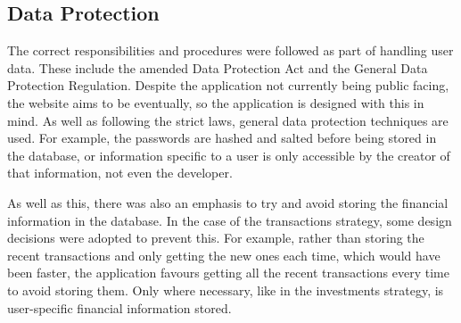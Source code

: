 \subsection{Data Protection}
The correct responsibilities and procedures were followed as part of handling user data. These include the amended Data Protection Act and the General Data Protection Regulation. Despite the application not currently being public facing, the website aims to be eventually, so the application is designed with this in mind. As well as following the strict laws, general data protection techniques are used. For example, the passwords are hashed and salted before being stored in the database, or information specific to a user is only accessible by the creator of that information, not even the developer.

As well as this, there was also an emphasis to try and avoid storing the financial information in the database. In the case of the transactions strategy, some design decisions were adopted to prevent this. For example, rather than storing the recent transactions and only getting the new ones each time, which would have been faster, the application favours getting all the recent transactions every time to avoid storing them. Only where necessary, like in the investments strategy, is user-specific financial information stored.